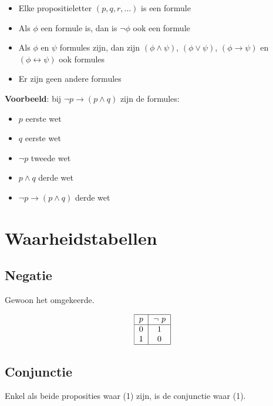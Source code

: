 \documentclass[a4paper, 12pt]{article}
\begin{document}
\begin{itemize}
	\item Elke propositieletter $(p, q, r, \ldots)$ is een formule
	\item Als $\phi$ een formule is, dan is $\neg \phi$ ook een formule
	\item Als $\phi$ en $\psi$ formules zijn, dan zijn $(\phi \land \psi)$, $(\phi \lor \psi)$, $(\phi \rightarrow \psi)$ en $(\phi \leftrightarrow \psi)$ ook formules
	\item Er zijn geen andere formules
\end{itemize}

\vspace{1cm}
\noindent\textbf{Voorbeeld}: bij \indent $\neg p \rightarrow (p \land q)$ \indent zijn de formules:

\begin{itemize}
	\item $p$ \hfill eerste wet
	\item $q$ \hfill eerste wet
	\item $\neg p$ \hfill tweede wet
	\item $p \land q$ \hfill derde wet
	\item $\neg p \rightarrow (p \land q)$ \hfill derde wet
\end{itemize}




\section{Waarheidstabellen}
\subsection{Negatie}

Gewoon het omgekeerde.

\[
\begin{tabular}{|c|c|}
	\hline	
	$p$ & $\neg$ $p$ \\
	\hline
	0 & 1\\
	1 & 0\\
	\hline
\end{tabular}
\]



\subsection{Conjunctie}

Enkel als beide proposities waar (1) zijn, is de conjunctie waar (1).
\end{document}
